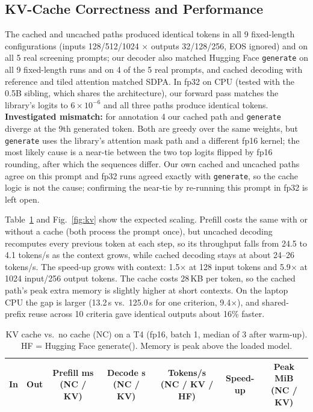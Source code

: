 \documentclass[conference]{IEEEtran}
\begin{document}
\subsection{KV-Cache Correctness and Performance}
The cached and uncached paths produced identical tokens in all 9 fixed-length configurations (inputs 128/512/1024 $\times$ outputs 32/128/256, EOS ignored) and on all 5 real screening prompts; our decoder also matched Hugging Face \texttt{generate} on all 9 fixed-length runs and on 4 of the 5 real prompts, and cached decoding with reference and tiled attention matched SDPA. In fp32 on CPU (tested with the 0.5B sibling, which shares the architecture), our forward pass matches the library's logits to $6\times10^{-6}$ and all three paths produce identical tokens. \textbf{Investigated mismatch:} for annotation 4 our cached path and \texttt{generate} diverge at the 9th generated token. Both are greedy over the same weights, but \texttt{generate} uses the library's attention mask path and a different fp16 kernel; the most likely cause is a near-tie between the two top logits flipped by fp16 rounding, after which the sequences differ. Our own cached and uncached paths agree on this prompt and fp32 runs agreed exactly with \texttt{generate}, so the cache logic is not the cause; confirming the near-tie by re-running this prompt in fp32 is left open.

Table~\ref{tab:kv} and Fig.~\ref{fig:kv} show the expected scaling. Prefill costs the same with or without a cache (both process the prompt once), but uncached decoding recomputes every previous token at each step, so its throughput falls from 24.5 to 4.1 tokens/s as the context grows, while cached decoding stays at about 24--26 tokens/s. The speed-up grows with context: 1.5$\times$ at 128 input tokens and 5.9$\times$ at 1024 input/256 output tokens. The cache costs 28\,KB per token, so the cached path's peak extra memory is slightly higher at short contexts. On the laptop CPU the gap is larger (13.2\,s vs.\ 125.0\,s for one criterion, 9.4$\times$), and shared-prefix reuse across 10 criteria gave identical outputs about 16\% faster.

\begin{table}[t]
\centering
\caption{KV cache vs.\ no cache (NC) on a T4 (fp16, batch 1, median of 3 after warm-up). HF = Hugging Face generate(). Memory is peak above the loaded model.}
\label{tab:kv}
\begin{tabular}{rrccccc}
\toprule
In & Out & Prefill ms (NC / KV) & Decode s (NC / KV) & Tokens/s (NC / KV / HF) & Speed-up & Peak MiB (NC / KV) \\
\midrule

\bottomrule
\end{tabular}
\end{table}
\end{document}

